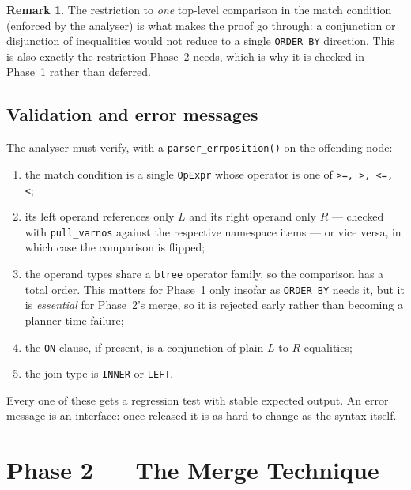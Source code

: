 \documentclass[11pt,a4paper]{report}
\theoremstyle{definition}
\newtheorem{remark}[definition]{Remark}
\theoremstyle{plain}
\newcommand{\code}[1]{\texttt{\small #1}}
\begin{document}
\begin{remark}
The restriction to \emph{one} top-level comparison in the match condition (enforced by the
analyser) is what makes the proof go through: a conjunction or disjunction of inequalities
would not reduce to a single \code{ORDER BY} direction. This is also exactly the restriction
Phase~2 needs, which is why it is checked in Phase~1 rather than deferred.
\end{remark}

\section{Validation and error messages}

The analyser must verify, with a \code{parser\_errposition()} on the offending node:

\begin{enumerate}[nosep,leftmargin=*]
\item the match condition is a single \code{OpExpr} whose operator is one of
      \code{>=, >, <=, <};
\item its left operand references only $L$ and its right operand only $R$ --- checked with
      \code{pull\_varnos} against the respective namespace items --- or vice versa, in which
      case the comparison is flipped;
\item the operand types share a \code{btree} operator family, so the comparison has a total
      order. This matters for Phase~1 only insofar as \code{ORDER BY} needs it, but it is
      \emph{essential} for Phase~2's merge, so it is rejected early rather than becoming a
      planner-time failure;
\item the \code{ON} clause, if present, is a conjunction of plain $L$-to-$R$ equalities;
\item the join type is \code{INNER} or \code{LEFT}.
\end{enumerate}

Every one of these gets a regression test with stable expected output. An error message is
an interface: once released it is as hard to change as the syntax itself.


\chapter{Phase 2 --- The Merge Technique}\label{ch:phase2}
\end{document}
